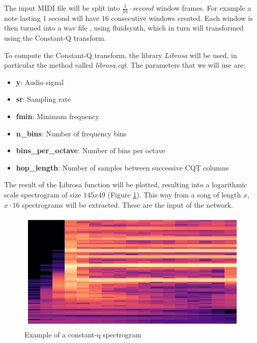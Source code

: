The input MIDI file will be split into $\frac{1}{16}\cdot second$ window frames. For example a note lasting 1 second will have 16 consecutive windows created. Each window is then turned into a wav file , using fluidsynth\cite{fluidsynth}, which in turn will transformed using the Constant-Q transform.

\par
To compute the Constant-Q transform, the library \textit{Librosa} \cite{librosa} will be used, in particular the method called \textit{librosa.cqt}.
The parameters that we will use are:
\begin{itemize}
	\item \textbf{y}: Audio signal
	\item \textbf{sr}: Sampling rate
	\item \textbf{fmin}: Minimum frequency
	\item \textbf{n\_bins}: Number of frequency bins
	\item \textbf{bins\_per\_octave}: Number of bins per octave
	\item \textbf{hop\_length}: Number of samples between successive CQT columns
\end{itemize}
\par

The result of the Librosa function will be plotted, resulting into a logarithmic scale spectrogram of size $145x49$ (Figure \ref{fig:q_spec}). This way from a song of length $x$, $x \cdot 16$ spectrograms will be extracted. These are the input of the network.  
	
\begin{figure}[h!]
	\caption[Example of a constant-q spectrogram]{ Example of a constant-q spectrogram }
	\centering
	\label{fig:q_spec}
	\includegraphics[width=1\textwidth, height=\textheight, keepaspectratio]{"resources/q_spec"}
\end{figure}

